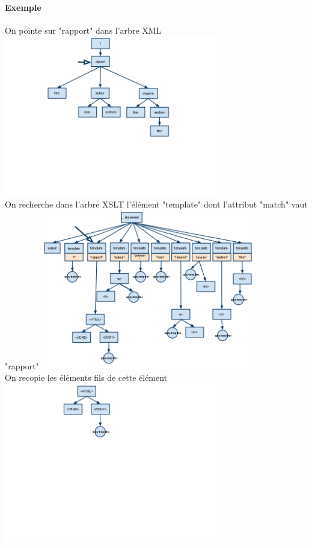	\paragraph{Exemple}
        \begin{center}
	        On pointe sur "rapport" dans l'arbre XML
	        \includegraphics[width=0.7\textwidth]{img/XMLa.png}\\
	        
	        On recherche dans l'arbre XSLT l'élément "template" dont l'attribut "match" vaut "rapport"
	        \includegraphics[width=0.7\textwidth]{img/XSLTa.png}\\
	        
	        On recopie les éléments fils de cette élément
	        \includegraphics[width=0.7\textwidth]{img/HTMLa.png}\\
	        

\end{center}
